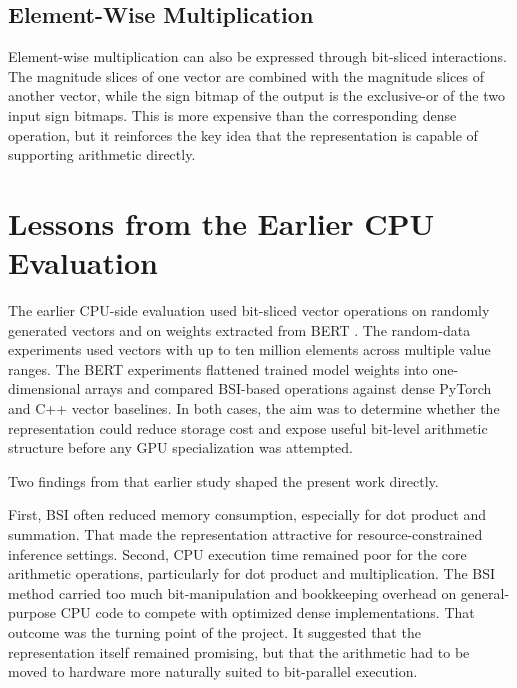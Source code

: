 \subsection{Element-Wise Multiplication}
Element-wise multiplication can also be expressed through bit-sliced interactions. The magnitude slices of one vector are combined with the magnitude slices of another vector, while the sign bitmap of the output is the exclusive-or of the two input sign bitmaps. This is more expensive than the corresponding dense operation, but it reinforces the key idea that the representation is capable of supporting arithmetic directly.

\section{Lessons from the Earlier CPU Evaluation}
The earlier CPU-side evaluation used bit-sliced vector operations on randomly generated vectors and on weights extracted from BERT \cite{bert,imdb}. The random-data experiments used vectors with up to ten million elements across multiple value ranges. The BERT experiments flattened trained model weights into one-dimensional arrays and compared BSI-based operations against dense PyTorch and C++ vector baselines. In both cases, the aim was to determine whether the representation could reduce storage cost and expose useful bit-level arithmetic structure before any GPU specialization was attempted.

Two findings from that earlier study shaped the present work directly.

First, BSI often reduced memory consumption, especially for dot product and summation. That made the representation attractive for resource-constrained inference settings. Second, CPU execution time remained poor for the core arithmetic operations, particularly for dot product and multiplication. The BSI method carried too much bit-manipulation and bookkeeping overhead on general-purpose CPU code to compete with optimized dense implementations. That outcome was the turning point of the project. It suggested that the representation itself remained promising, but that the arithmetic had to be moved to hardware more naturally suited to bit-parallel execution.

